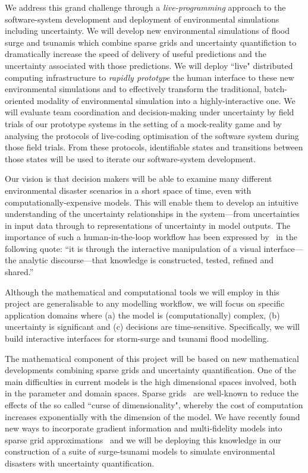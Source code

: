 \documentclass[a4paper,fontsize=12pt]{scrartcl}
\begin{document}
We address this grand
challenge through a {\em live-programming} approach to the software-system development
and deployment of  environmental simulations including uncertainty. 
We will develop new environmental simulations of flood surge and tsunamis which combine sparse grids and uncertainty quantifiction to dramatically increase the speed of delivery of useful predictions and the uncertainty associated with those predictions.
We will deploy  ``live"  distributed
computing infrastructure to {\em rapidly prototype} the human interface to these new environmental simulations and to effectively transform the
traditional, batch-oriented modality of environmental simulation into a highly-interactive one. We will 
evaluate team coordination and decision-making under uncertainty by field trials of our prototype systems in the setting of a mock-reality game and by analysing the protocols of live-coding optimisation of the software system during those field trials. From these protocols, identifiable states and transitions between those states will be used to iterate our software-system development. 

Our vision is that decision makers
will be able to examine many different environmental disaster scenarios in a short space of
time, even with computationally-expensive models. This will enable
them to develop an intuitive understanding of the uncertainty
relationships in the system---from uncertainties in input data through
to representations of uncertainty in model outputs. The importance of
such a human-in-the-loop workflow has been expressed
by~\textcite{pike_science_2009} in the following quote: ``it is through the interactive
manipulation of a visual interface---the analytic discourse---that
knowledge is constructed, tested, refined and shared.''

Although the mathematical and computational tools we will employ in
this project are generalisable to any modelling workflow, we will
focus on specific application domains where (a) the model is (computationally)
complex, (b) uncertainty is significant and (c) decisions are
time-sensitive. Specifically, we will build interactive interfaces for
 storm-surge and tsunami flood modelling. 

The mathematical component of this project will be based on new
mathematical developments combining sparse grids and uncertainty
quantification. One of the main difficulties in current models is the
high dimensional spaces involved, both in the parameter and
domain spaces. Sparse grids~\parencite{BungartzGriebel2004} are
well-known to reduce the effects of the so called ``curse of
dimensionality", whereby the cost of computation increases
exponentially with the dimension of the model.
We have recently found new ways to incorporate gradient
information and multi-fidelity models into sparse grid
approximations~\parencite{deBaarHarding2015,Jakeman2015,deBaarRDM2015} and we will be
deploying this knowledge in our construction of a suite of surge-tsunami models to simulate
environmental disasters with uncertainty quantification.
\end{document}

